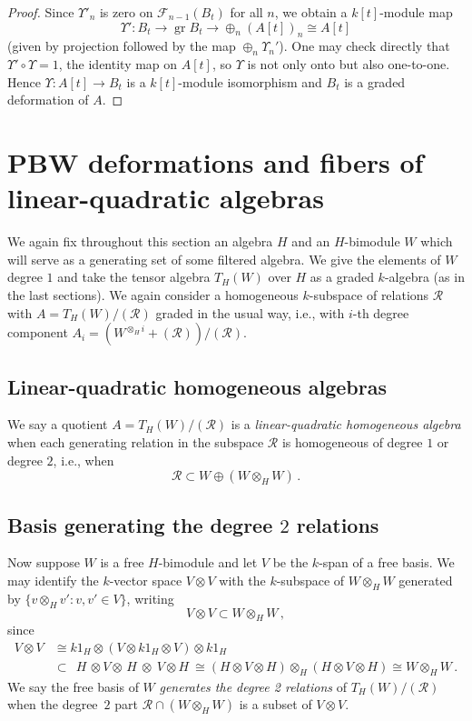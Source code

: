 \documentclass[11pt]{amsart}
\numberwithin{equation}{section}
\DeclareMathOperator{\gr}{gr}
\newcommand{\A}{A}%
\newcommand{\BBB}{B}
\newcommand{\sA}{A }
\newcommand{\RR}{\mathscr{R} }
\renewcommand{\_}[1]{\mbox{$_{\left( #1 \right)}$}}
\newcommand{\F}{\mathcal F}
\newcommand{\ot}{\otimes}
\newcommand{\Ho}{H}%
\begin{document}
{\begin{proof}
Since $\Upsilon'_n$ is zero on $\F_{n-1}(\BBB_t)$ for all $n$,
we obtain a $k[t]$-module map
$$\Upsilon': \BBB_t\longrightarrow
\gr \BBB_t\longrightarrow \oplus_n (\sA[t])_n\cong \sA[t]$$
(given by projection followed by the map $\oplus_n \Upsilon_n'$).
One may check directly that $\Upsilon' \circ \Upsilon = 1$,
the identity map on $\sA[t]$,
so $\Upsilon$ is not only onto but also 
one-to-one. 
Hence $\Upsilon: \sA[t] \rightarrow \BBB_t$ is a 
$k[t]$-module isomorphism
and $\BBB_t$ is a graded deformation of $\sA$.
\end{proof}

\section{PBW deformations and fibers of linear-quadratic algebras}
\label{sec:LinearQuadraticAlgs}

We again fix throughout this section an algebra $H$ and an 
$H$-bimodule $W$ which will serve as a generating set of some filtered
algebra. We give the elements of $W$ degree $1$ and take
the tensor algebra $T_{H}(W)$ over $H$ as a graded
$k$-algebra (as in the last sections).
We again consider a homogeneous $k$-subspace of relations $\RR$
with $A=T_H(W)/(\RR)$ graded in the usual way, i.e.,
with $i$-th degree component
$A_i=(W^{\ot_{\!\Ho} i} + (\RR))/ (\RR)$.

\subsection*{Linear-quadratic homogeneous algebras}
We say a quotient $\A=T_{H}(W)/(\RR)$ is a
{\em linear-quadratic homogeneous algebra}
when each generating relation in the subspace $\RR$
is homogeneous of degree $1$ or degree $2$, i.e., when
$$\RR \subset W \oplus (W\ot_H W)\, .$$

\subsection*{Basis generating the degree $2$ relations}
Now suppose $W$ is a free $H$-bimodule and let $V$
be the $k$-span of a free basis.
We may identify
the $k$-vector space
$V\ot V$ with the $k$-subspace 
of $W\ot_H W$ generated by $\{v\ot_H v': v, v'\in V\}$,
writing
\begin{equation}\label{eqn:VVWW}
   V\ot V\subset  W\ot_H W\, ,
\end{equation}
since
$$
\begin{aligned}
  V\ot V 
  &\cong k1_H \ot (V\ot k1_H \ot V)\ot k1_H \\
  &\subset \ \ 
  H\, \ot V\ot \, H\ \ot\ V \ot H\
  \cong (H\ot V\ot H) \ot_H (H \ot V \ot H)
  \cong W\ot_H W 
  \, .
\end{aligned}
$$
We say the free basis of $W$ {\em generates the degree 2 relations}
of 
$T_H(W)/(\RR)$ 
when the degree~$2$ part $\RR\cap (W\ot_H W)$
is a subset of $V\ot V$.

}
\end{document}
